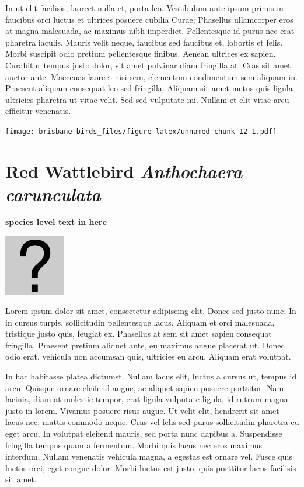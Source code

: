 \documentclass[]{book}
\let\origfigure\figure
\let\endorigfigure\endfigure
\renewenvironment{figure}[1][2] {
  \expandafter\origfigure\expandafter[H]
} {
  \endorigfigure
}
\begin{document}
In ut elit facilisis, laoreet nulla et, porta leo. Vestibulum ante ipsum
primis in faucibus orci luctus et ultrices posuere cubilia Curae;
Phasellus ullamcorper eros at magna malesuada, ac maximus nibh
imperdiet. Pellentesque id purus nec erat pharetra iaculis. Mauris velit
neque, faucibus sed faucibus et, lobortis et felis. Morbi suscipit odio
pretium pellentesque finibus. Aenean ultrices ex sapien. Curabitur
tempus justo dolor, sit amet pulvinar diam fringilla at. Cras sit amet
auctor ante. Maecenas laoreet nisi sem, elementum condimentum sem
aliquam in. Praesent aliquam consequat leo sed fringilla. Aliquam sit
amet metus quis ligula ultricies pharetra ut vitae velit. Sed sed
vulputate mi. Nullam et elit vitae arcu efficitur venenatis.

\begin{figure}
\centering
\texttt{[image: brisbane-birds\_files/figure-latex/unnamed-chunk-12-1.pdf]}
\caption{\label{fig:unnamed-chunk-12}insert figure caption}
\end{figure}

\section{\texorpdfstring{Red Wattlebird \emph{Anthochaera
carunculata}}{Red Wattlebird Anthochaera carunculata}}\label{red-wattlebird-anthochaera-carunculata}

\textbf{species level text in here}

\begin{figure}
\centering
\includegraphics{assets/missing.png}
\caption{No image for species}
\end{figure}

Lorem ipsum dolor sit amet, consectetur adipiscing elit. Donec sed justo
nunc. In in cursus turpis, sollicitudin pellentesque lacus. Aliquam et
orci malesuada, tristique justo quis, feugiat ex. Phasellus at sem sit
amet sapien consequat fringilla. Praesent pretium aliquet ante, eu
maximus augue placerat ut. Donec odio erat, vehicula non accumsan quis,
ultricies eu arcu. Aliquam erat volutpat.

In hac habitasse platea dictumst. Nullam lacus elit, luctus a cursus ut,
tempus id arcu. Quisque ornare eleifend augue, ac aliquet sapien posuere
porttitor. Nam lacinia, diam at molestie tempor, erat ligula vulputate
ligula, id rutrum magna justo in lorem. Vivamus posuere risus augue. Ut
velit elit, hendrerit sit amet lacus nec, mattis commodo neque. Cras vel
felis sed purus sollicitudin pharetra eu eget arcu. In volutpat eleifend
mauris, sed porta nunc dapibus a. Suspendisse fringilla tempus quam a
fermentum. Morbi quis lacus nec eros maximus interdum. Nullam venenatis
vehicula magna, a egestas est ornare vel. Fusce quis luctus orci, eget
congue dolor. Morbi luctus est justo, quis porttitor lacus facilisis sit
amet.
\end{document}
